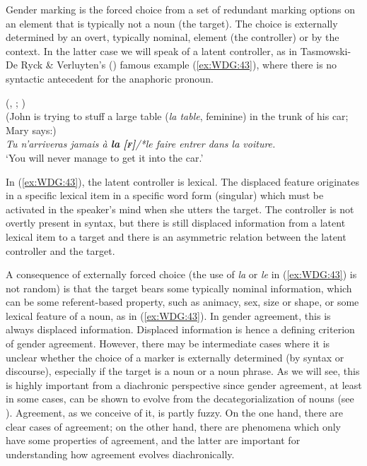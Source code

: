 \documentclass[output=collectionpaper]{langsci/langscibook}
\begin{document}
Gender marking is the forced choice from a set of redundant marking options on an element that is typically not a noun (the target). The choice is externally determined by an overt, typically nominal, element (the controller) or by the context. In the latter case we will speak of a latent controller, as in Tasmowski-De Ryck \& Verluyten's (\citeyear[328]{Tasmowski1982}) famous  example (\ref{ex:WDG:43}), where there is no syntactic antecedent for the anaphoric pronoun.

\ea\label{ex:WDG:43}
 (, ; \citealt[328]{Tasmowski1982})\\
(John is trying to stuff a large table (\textit{la table}, feminine) in the trunk of his car; Mary says:)\\
\textit{Tu n'arriveras jamais à \textbf{la} {\normalfont \textbf{[\textsc{f}]}}/*le {\normalfont [\textsc{m}]} faire entrer dans la voiture.}\\
`You will never manage to get it into the car.'\\
\z

In (\ref{ex:WDG:43}), the latent controller is lexical. The displaced feature originates in a specific lexical item in a specific word form (singular) which must be activated in the speaker's mind when she utters the target. The controller is not overtly present in syntax, but there is still displaced information from a latent lexical item to a target and there is an asymmetric relation between the latent controller and the target.

A consequence of externally forced choice (the use of \textit{la} or \textit{le} in (\ref{ex:WDG:43}) is not random) is that the target bears some typically nominal information, which can be some referent-based property, such as animacy, sex, size or shape, or some lexical feature of a noun, as in (\ref{ex:WDG:43}). In gender agreement, this is always displaced information. Displaced information is hence a defining criterion of gender agreement. However, there may be intermediate cases where it is unclear whether the choice of a marker is externally determined (by syntax or discourse), especially if the target is a noun or a noun phrase. As we will see, this is highly important from a diachronic perspective since gender agreement, at least in some cases, can be shown to evolve from the decategorialization of nouns (see ). Agreement, as we conceive of it, is partly fuzzy. On the one hand, there are clear cases of agreement; on the other hand, there are phenomena which only have some properties of agreement, and the latter are important for understanding how agreement evolves diachronically.
\end{document}
